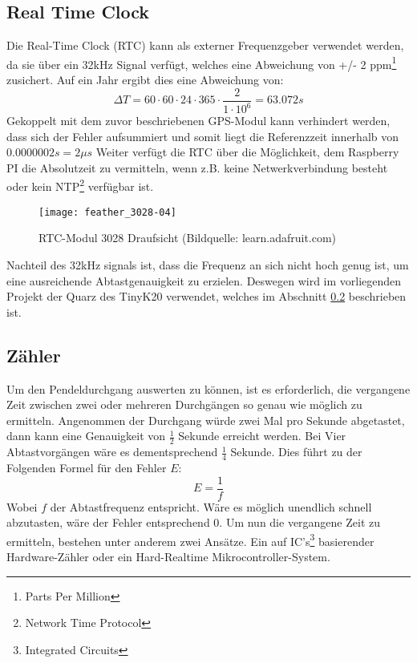 \subsection{Real Time Clock}
\label{cap:RTC}
	Die Real-Time Clock (RTC) kann als externer Frequenzgeber verwendet werden, da sie über ein 32kHz Signal verfügt, welches eine Abweichung von +/- 2 ppm\footnote{Parts Per Million} zusichert. Auf ein Jahr ergibt dies eine Abweichung von:
	\[
		\Delta{T} = 60 \cdot 60 \cdot 24 \cdot 365 \cdot \frac{2}{1\cdot 10^6} = 63.072s
	\]
	Gekoppelt mit dem zuvor beschriebenen GPS-Modul kann verhindert werden, dass sich der Fehler aufsummiert und somit liegt die Referenzzeit innerhalb von $0.0000002s = 2\mu{s}$ 
	Weiter verfügt die RTC über die Möglichkeit, dem Raspberry PI die Absolutzeit zu vermitteln, wenn z.B. keine Netwerkverbindung besteht oder kein NTP\footnote{Network Time Protocol} verfügbar ist.
		\begin{figure}[H]
        	\centering
        	\texttt{[image: feather\_3028-04]}
        	\caption{RTC-Modul 3028 Draufsicht (Bildquelle: learn.adafruit.com)}
        	\label{fig:RTC3028}
    	\end{figure}
Nachteil des 32kHz signals ist, dass die Frequenz an sich nicht hoch genug ist, um eine ausreichende Abtastgenauigkeit zu erzielen. Deswegen wird im vorliegenden Projekt der Quarz des TinyK20 verwendet, welches im Abschnitt \ref{cap:counter} beschrieben ist.
%
%
\subsection{Zähler}
\label{cap:counter}
	Um den Pendeldurchgang auswerten zu können, ist es erforderlich, die vergangene Zeit zwischen zwei oder mehreren Durchgängen so genau wie möglich zu ermitteln. Angenommen der Durchgang würde zwei Mal pro Sekunde abgetastet, dann kann eine Genauigkeit von $\frac{1}{2}$ Sekunde erreicht werden. Bei Vier Abtastvorgängen wäre es dementsprechend $\frac{1}{4}$ Sekunde. Dies führt zu der Folgenden Formel für den Fehler $E$:
	\[
		E = \frac{1}{f}
	\]
	Wobei $f$ der Abtastfrequenz entspricht. Wäre es möglich unendlich schnell abzutasten, wäre der Fehler entsprechend 0. Um nun die vergangene Zeit zu ermitteln, bestehen unter anderem zwei Ansätze. Ein auf IC's\footnote{Integrated Circuits} basierender Hardware-Zähler oder ein Hard-Realtime Mikrocontroller-System.
